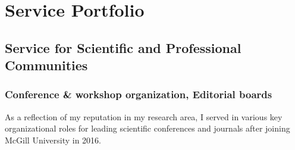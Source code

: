 \chapter{Service Portfolio}
\label{sec:service-portfolio}

\section{Service for Scientific and Professional Communities}



\subsection{Conference \& workshop organization, Editorial boards}

As a reflection of my reputation in my research area, I served in various key organizational roles for leading scientific conferences and journals after joining McGill University in 2016. 

